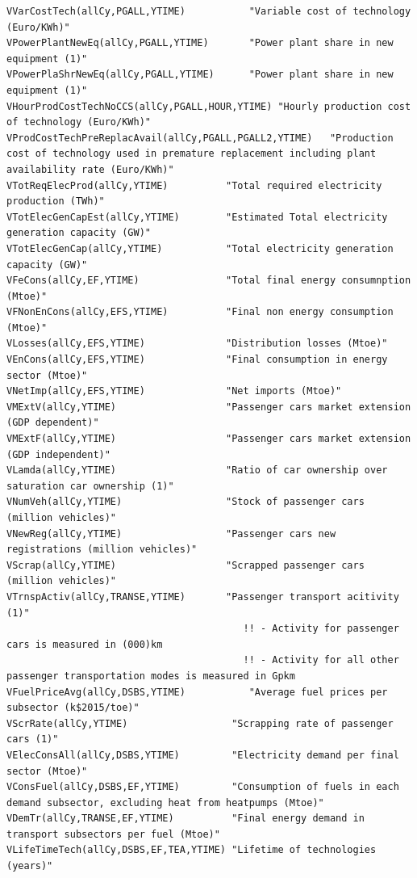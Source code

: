 \documentclass[a4paper,]{scrartcl}
\begin{document}
\begin{lstlisting}
VVarCostTech(allCy,PGALL,YTIME)           "Variable cost of technology (Euro/KWh)"  
VPowerPlantNewEq(allCy,PGALL,YTIME)       "Power plant share in new equipment (1)"
VPowerPlaShrNewEq(allCy,PGALL,YTIME)      "Power plant share in new equipment (1)"      
VHourProdCostTechNoCCS(allCy,PGALL,HOUR,YTIME) "Hourly production cost of technology (Euro/KWh)"    
VProdCostTechPreReplacAvail(allCy,PGALL,PGALL2,YTIME)   "Production cost of technology used in premature replacement including plant availability rate (Euro/KWh)"      
VTotReqElecProd(allCy,YTIME)          "Total required electricity production (TWh)" 
VTotElecGenCapEst(allCy,YTIME)        "Estimated Total electricity generation capacity (GW)"    
VTotElecGenCap(allCy,YTIME)           "Total electricity generation capacity (GW)"  
VFeCons(allCy,EF,YTIME)               "Total final energy consumnption (Mtoe)"
VFNonEnCons(allCy,EFS,YTIME)          "Final non energy consumption (Mtoe)"
VLosses(allCy,EFS,YTIME)              "Distribution losses (Mtoe)"
VEnCons(allCy,EFS,YTIME)              "Final consumption in energy sector (Mtoe)"
VNetImp(allCy,EFS,YTIME)              "Net imports (Mtoe)"
VMExtV(allCy,YTIME)                   "Passenger cars market extension (GDP dependent)"
VMExtF(allCy,YTIME)                   "Passenger cars market extension (GDP independent)"
VLamda(allCy,YTIME)                   "Ratio of car ownership over saturation car ownership (1)"
VNumVeh(allCy,YTIME)                  "Stock of passenger cars (million vehicles)"
VNewReg(allCy,YTIME)                  "Passenger cars new registrations (million vehicles)"
VScrap(allCy,YTIME)                   "Scrapped passenger cars (million vehicles)"
VTrnspActiv(allCy,TRANSE,YTIME)       "Passenger transport acitivity (1)"
                                         !! - Activity for passenger cars is measured in (000)km
                                         !! - Activity for all other passenger transportation modes is measured in Gpkm
VFuelPriceAvg(allCy,DSBS,YTIME)           "Average fuel prices per subsector (k$2015/toe)"
VScrRate(allCy,YTIME)                  "Scrapping rate of passenger cars (1)"
VElecConsAll(allCy,DSBS,YTIME)         "Electricity demand per final sector (Mtoe)"
VConsFuel(allCy,DSBS,EF,YTIME)         "Consumption of fuels in each demand subsector, excluding heat from heatpumps (Mtoe)"
VDemTr(allCy,TRANSE,EF,YTIME)          "Final energy demand in transport subsectors per fuel (Mtoe)"
VLifeTimeTech(allCy,DSBS,EF,TEA,YTIME) "Lifetime of technologies (years)"
\end{lstlisting}
\end{document}
